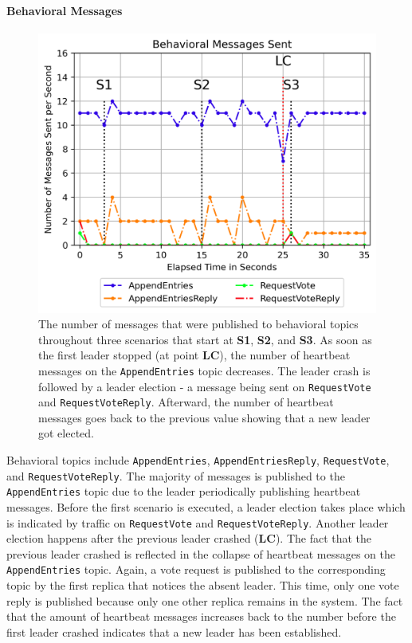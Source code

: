 \paragraph{Behavioral Messages}

\begin{figure}[h!]
	\centering
	\includegraphics[width=0.8\linewidth]{images/plots/ConsensusMessagesSent}
	\caption{The number of messages that were published to behavioral topics throughout three scenarios that start at \textbf{S1}, \textbf{S2}, and \textbf{S3}. As soon as the first leader stopped (at point \textbf{LC}), the number of heartbeat messages on the \texttt{AppendEntries} topic decreases. The leader crash is followed by a leader election - a message being sent on \texttt{RequestVote} and \texttt{RequestVoteReply}. Afterward, the number of heartbeat messages goes back to the previous value showing that a new leader got elected.}
	\label{fig:PlotConsensusMessagesSent}
\end{figure}

Behavioral topics include \texttt{AppendEntries}, \texttt{AppendEntriesReply}, \texttt{RequestVote}, and \texttt{RequestVoteReply}.
The majority of messages is published to the \texttt{AppendEntries} topic due to the leader periodically publishing heartbeat messages.
Before the first scenario is executed, a leader election takes place which is indicated by traffic on \texttt{RequestVote} and \texttt{RequestVoteReply}.
Another leader election happens after the previous leader crashed (\textbf{LC}).
The fact that the previous leader crashed is reflected in the collapse of heartbeat messages on the \texttt{AppendEntries} topic.
Again, a vote request is published to the corresponding topic by the first replica that notices the absent leader.
This time, only one vote reply is published because only one other replica remains in the system.
The fact that the amount of heartbeat messages increases back to the number before the first leader crashed indicates that a new leader has been established.


